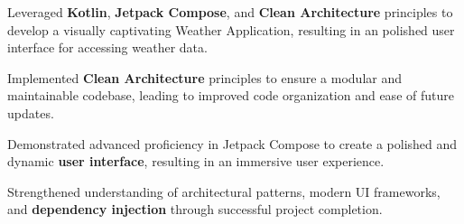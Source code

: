\documentclass[bold]{deedy-resume-openfont}
\begin{document}
\begin{minipage}[t]{0.66\textwidth}
\begin{tightemize}
\item Leveraged \textbf{Kotlin}, \textbf{Jetpack Compose}, and \textbf{Clean Architecture} principles to develop a visually captivating Weather Application, resulting in an polished user interface for accessing weather data.
\item Implemented \textbf{Clean Architecture} principles to ensure a modular and maintainable codebase, leading to improved code organization and ease of future updates.
\item Demonstrated advanced proficiency in Jetpack Compose to create a polished and dynamic \textbf{user interface}, resulting in an immersive user experience.
\item Strengthened understanding of architectural patterns, modern UI frameworks, and \textbf{dependency injection} through successful project completion.
\end{tightemize}
\sectionsep


\end{minipage} 
\end{document}
